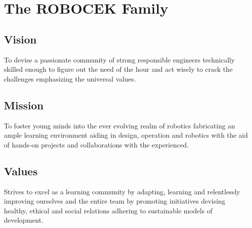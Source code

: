 \cleardoublepage
\chapter{The ROBOCEK Family}
\section{Vision}
\justify
    To devise a passionate community of strong responsible engineers technically skilled enough to figure out the need of the hour and act wisely to crack the challenges emphasizing the universal values.
\section{Mission}
    To foster young minds into the ever evolving realm of robotics fabricating an ample learning environment aiding in design, operation and robotics with the aid of hands-on projects and collaborations with the experienced. 
\section{Values}
    Strives to excel as a learning community by adapting, learning and relentlessly improving ourselves and the entire team by promoting initiatives devising healthy, ethical and social relations adhering to sustainable models of development. 

